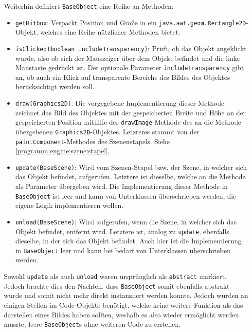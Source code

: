 \begin{sloppypar}
Weiterhin definiert \texttt{BaseObject} eine Reihe an
Methoden:

\begin{itemize}
	\item \texttt{getHitbox}: Verpackt Position und Größe in ein
	      \texttt{java.awt.geom.Rectangle2D}-Objekt, welches eine
	      Reihe nützlicher Methoden bietet.
	\item \texttt{isClicked(boolean includeTransparency)}: Prüft,
	      ob das Objekt angeklickt wurde, also ob sich der Mauszeiger
	      über dem Objekt befindet und die linke Maustaste gedrückt
	      ist. Der optionale Parameter \texttt{includeTransparency}
	      gibt an, ob auch ein Klick auf transparente Bereiche
	      des Bildes des Objektes berücksichtigt werden soll.
	\item \texttt{draw(Graphics2D)}: Die vorgegebene Implementierung
	      dieser Methode zeichnet das Bild des Objektes mit der
	      gespeicherten Breite und Höhe an der gespeicherten Position
	      mithilfe der \texttt{drawImage}-Methode des an die Methode
	      übergebenen \texttt{Graphics2D}-Objektes. Letzteres stammt
	      von der \texttt{paintComponent}-Methodes des Szenenstapels.
	      Siehe \ref{programm:engine:szene:stapel}.
	\item \texttt{update(BaseScene)}: Wird vom Szenen-Stapel bzw.
	      der Szene, in welcher sich das Objekt befindet, aufgerufen.
	      Letztere ist dieselbe, welche an die Methode als Parameter
	      übergeben wird. Die Implementierung dieser Methode in
	      \texttt{BaseObject} ist leer und kann von Unterklassen
	      überschrieben werden, die eigene Logik implementieren wollen.
	\item \texttt{unload(BaseScene)}: Wird aufgerufen, wenn die Szene,
	      in welcher sich das Objekt befindet, entfernt wird. Letztere
	      ist, analog zu \texttt{update}, ebenfalls dieselbe, in der
	      sich das Objekt befindet. Auch hier ist die Implementierung in
	      \texttt{BaseObject} leer und kann bei bedarf von Unterklassen
	      überschrieben werden.
\end{itemize}

Sowohl \texttt{update} als auch \texttt{unload} waren ursprünglich als
\texttt{abstract} markiert. Jedoch brachte dies den Nachteil, dass
\texttt{BaseObject} somit ebenfalls abstrakt wurde und somit nicht
mehr direkt instanziiert werden konnte. Jedoch wurden an einigen
Stellen im Code Objekte benötigt, welche keine weitere Funktion als
das darstellen eines Bildes haben sollten, weshalb es also wieder
ermöglicht werden musste, \glqq{}leere\grqq{} \texttt{BaseObject}s
ohne weiteren Code zu erstellen.



\end{sloppypar}
